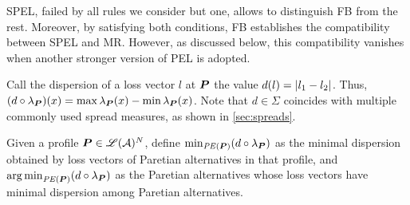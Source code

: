 \documentclass[version=3.21, pagesize, twoside=off, bibliography=totoc, DIV=calc, fontsize=12pt, a4paper]{scrartcl}
\begin{document}
SPEL, failed by all rules we consider but one, allows to distinguish FB from the rest. Moreover, by satisfying both conditions, FB establishes the compatibility between SPEL and MR. However, as discussed below, this compatibility vanishes when another stronger version of PEL is adopted. 

Call the dispersion of a loss vector $l$ at $\bm{P}$ the value $d(l) = \lvert l_1 - l_2\rvert$. 
Thus, $(d \circ \lprof)(x) = \max\lprof(x) - \min\lprof(x)$.
Note that $d \in \Sigma$ coincides with multiple commonly used spread measures, as shown in \cref{sec:spreads}.

Given a profile $\bm{P} \in \mathscr{L}(\mathcal{A})^N$, define $\min_{\PE} (d \circ \lprof)$ as the minimal dispersion obtained by loss vectors of Paretian alternatives in that profile, and $\argmin_{\PE} (d \circ \lprof)$ as the Paretian alternatives whose loss vectors have minimal dispersion among Paretian alternatives.
\end{document}
